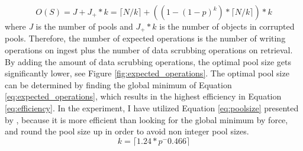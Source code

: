 \begin{equation}\label{eq:expected_operations}
    O(S) = J + J_+ * k = \lceil N/k \rceil + ((1-(1-p)^k)* \lceil N/k \rceil) * k
\end{equation}
where \textit{J} is the number of pools and \textit{$J_+ * k$} is the number of objects in corrupted pools. Therefore, the number of expected operations is the number of writing operations on ingest plus the number of data scrubbing operations on retrieval. By adding the amount of data scrubbing operations, the optimal pool size gets significantly lower, see Figure \ref{fig:expected_operations}. The optimal pool size  can be determined by finding the global minimum of Equation \ref{eq:expected_operations}, which results in the highest efficiency in Equation \ref{eq:efficiency}.
In the experiment, I have utilized Equation \ref{eq:poolsize} presented by \cite[3]{regen2020simple}, because it is more efficient than looking for the global minimum by force, and round the pool size up in order to avoid non integer pool sizes.
\begin{equation}\label{eq:poolsize}
    k = \lceil 1.24*p^-0.466 \rceil
\end{equation}
